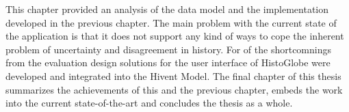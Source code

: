 



\vspace{2em}

This chapter provided an analysis of the data model and the implementation developed in the previous chapter. The main problem with the current state of the application is that it does not support any kind of ways to cope the inherent problem of uncertainty and disagreement in history. For of the shortcomnings from the evaluation design solutions for the user interface of HistoGlobe were developed and integrated into the Hivent Model. The final chapter of this thesis summarizes the achievements of this and the previous chapter, embeds the work into the current state-of-the-art and concludes the thesis as a whole.